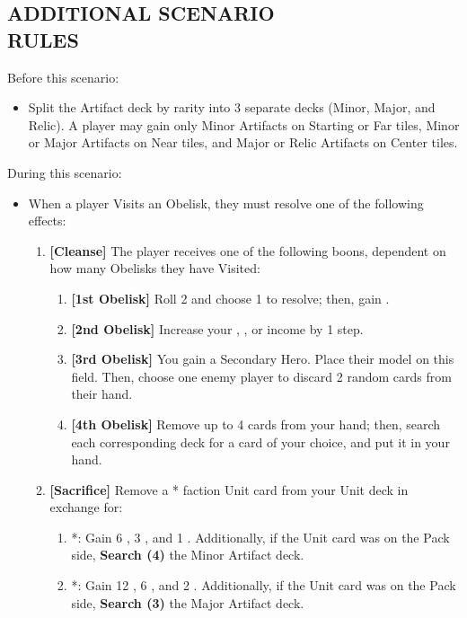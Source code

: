 \begin{multicols*}{2}
\subsection*{\MakeUppercase{Additional Scenario\\Rules}}
Before this scenario:
\begin{itemize}
    \item Split the Artifact deck by rarity into 3 separate decks (Minor, Major, and Relic). A player may gain only Minor Artifacts on Starting or Far tiles, Minor or Major Artifacts on Near tiles, and Major or Relic Artifacts on Center tiles.
\end{itemize}
During this scenario:
\begin{itemize}
    \item When a player Visits an Obelisk, they must resolve one of the following effects:
    \begin{enumerate}[leftmargin=15pt]
        \item \textbf{[Cleanse]} The player receives one of the following boons, dependent on how many Obelisks they have Visited:
        \begin{enumerate}
            \item \textbf{[1st Obelisk]} Roll 2  and choose 1 to resolve; then, gain .
            \item \textbf{[2nd Obelisk]} Increase your , , or  income by 1 step.
            \item \textbf{[3rd Obelisk]} You gain a Secondary Hero. Place their model on this field. Then, choose one enemy player to discard 2 random cards from their hand.
            \item \textbf{[4th Obelisk]} Remove up to 4 cards from your hand; then, search each corresponding deck for a card of your choice, and put it in your hand.
        \end{enumerate}
        \item \textbf{[Sacrifice]} Remove a * faction Unit card from your Unit deck in exchange for:
        \begin{enumerate}
            \item *: Gain 6 , 3 , and 1 . Additionally, if the Unit card was on the Pack side, \textbf{Search (4)} the Minor Artifact deck.
            \item *: Gain 12 , 6 , and 2 . Additionally, if the Unit card was on the Pack side, \textbf{Search (3)} the Major Artifact deck.

\end{enumerate}
\end{enumerate}
\end{itemize}
\end{multicols*}
